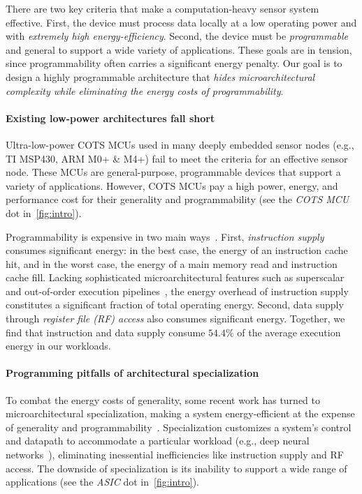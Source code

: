 There are two key criteria that make a computation-heavy sensor system effective.
First, the device must process data locally at a low operating power and with \emph{extremely high energy-efficiency}.
Second, the device must be \emph{programmable} and general to support a wide variety of applications.
% 
These goals are in tension, since programmability often carries a significant energy penalty.
Our goal is to design a highly programmable architecture that \emph{hides microarchitectural complexity while eliminating the energy costs of programmability}.

\paragraph{Existing low-power architectures fall short}
Ultra-low-power COTS MCUs used in many deeply embedded sensor nodes
(e.g., TI MSP430, ARM M0+ \& M4+) fail
to meet the criteria for an effective sensor node.
%
These MCUs are general-purpose, programmable devices that support a variety of
applications.  
%
However, COTS MCUs pay a high power, energy, and performance cost for their
generality and programmability (see the \textit{COTS MCU} dot in~\autoref{fig:intro}).  
%

Programmability is expensive in two main ways~\cite{horowitz:isscc14:energy-keynote,hameed2010understanding,balfour_elm_thesis}.
First, \emph{instruction supply} consumes significant energy: in the best case, the energy of
an instruction cache hit, and in the worst case, the energy of a main memory
read and instruction cache fill.  
%
Lacking sophisticated microarchitectural features such as superscalar and
out-of-order execution pipelines~\cite{msp430fr5994,traber2016pulpino}, the energy overhead of
instruction supply constitutes a significant fraction of total operating energy.
%
Second, data supply through \emph{register file (RF) access} also consumes significant energy.
%
Together, we find that instruction and data supply consume
$54.4\%$ of the average execution energy in our workloads.

\paragraph{Programming pitfalls of architectural specialization}
To combat the energy costs of generality, some recent work has turned to
microarchitectural specialization, making a system energy-efficient at the
expense of generality and
programmability~\cite{chen:isca16:eyeriss,chen:asplos14:diannao,du:isca15:shidiannao,liu:isca15:pudiannao,chen2014dadiannao,venkatesh2010conservation}.
Specialization customizes a system's control and datapath to accommodate a
particular workload (e.g., deep neural networks~\cite{chen:isca16:eyeriss,chen:asplos14:diannao}),
eliminating inessential inefficiencies like instruction supply and RF access.
The downside of specialization is its 
inability to support a wide range of applications (see the \textit{ASIC} dot in~\autoref{fig:intro}).

